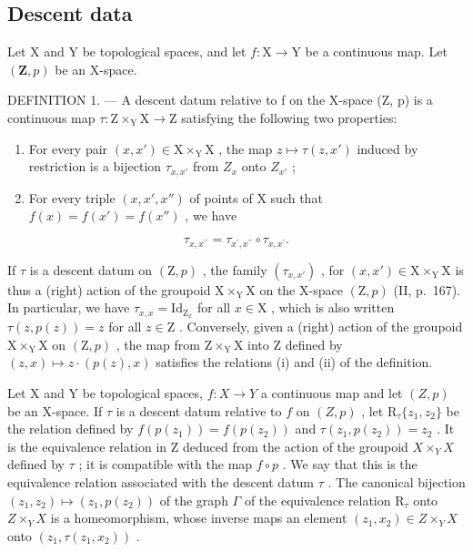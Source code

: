 \subsection{Descent data}

Let X and Y be topological spaces, and let \(f \colon \mathrm{X} \to \mathrm{Y}\) be a continuous map. Let \((\mathbf{Z}, p)\) be an X-space.

DEFINITION 1. --- A descent datum relative to f on the X-space (Z, p) is a continuous map \(\tau\colon \mathrm{Z}\times_{\mathrm{Y}}\mathrm{X}\to\mathrm{Z}\) satisfying the following two properties:

\begin{enumerate}
\def\labelenumi{(\roman{enumi})}
\item
  For every pair \((x, x') \in \mathrm{X} \times_{\mathrm{Y}} \mathrm{X}\) , the map \(z \mapsto \tau(z, x')\) induced by restriction is a bijection \(\tau_{x,x'}\) from \(Z_x\) onto \(Z_{x'}\) ;
\item
  For every triple \((x,x',x'')\) of points of X such that \(f(x)=f(x')=f(x'')\) , we have
\end{enumerate}

\[
\tau_ {x, x ^ {\prime \prime}} = \tau_ {x ^ {\prime}, x ^ {\prime \prime}} \circ \tau_ {x, x ^ {\prime}}.
\]

If \(\tau\) is a descent datum on \((\mathrm{Z},p)\) , the family \((\tau_{x,x'})\) , for \((x,x')\in \mathrm{X}\times_{\mathrm{Y}}\mathrm{X}\) is thus a (right) action of the groupoid \(\mathrm{X}\times_{\mathrm{Y}}\mathrm{X}\) on the X-space \((\mathrm{Z},p)\) (II, p.~167). In particular, we have \(\tau_{x,x} = \mathrm{Id}_{\mathrm{Z}_x}\) for all \(x\in \mathrm{X}\) , which is also written \(\tau (z,p(z)) = z\) for all \(z\in \mathrm{Z}\) . Conversely, given a (right) action of the groupoid \(\mathrm{X}\times_{\mathrm{Y}}\mathrm{X}\) on \((\mathrm{Z},p)\) , the map from \(\mathrm{Z}\times_{\mathrm{Y}}\mathrm{X}\) into Z defined by \((z,x)\mapsto z\cdot (p(z),x)\) satisfies the relations (i) and (ii) of the definition.

Let X and Y be topological spaces, \(f\colon X\to Y\) a continuous map and let \((Z,p)\) be an X-space. If \(\tau\) is a descent datum relative to \(f\) on \((Z,p)\) , let \(\mathrm{R}_{\tau}\{z_{1},z_{2}\}\) be the relation defined by \(f(p(z_{1})) = f(p(z_{2}))\) and \(\tau (z_1,p(z_2)) = z_2\) . It is the equivalence relation in Z deduced from the action of the groupoid \(X\times_Y X\) defined by \(\tau\) ; it is compatible with the map \(f\circ p\) . We say that this is the equivalence relation associated with the descent datum \(\tau\) . The canonical bijection \((z_{1},z_{2})\mapsto (z_{1},p(z_{2}))\) of the graph \(\Gamma\) of the equivalence relation \(\mathrm{R}_{\tau}\) onto \(Z\times_Y X\) is a homeomorphism, whose inverse maps an element \((z_{1},x_{2})\in Z\times_Y X\) onto \((z_{1},\tau (z_{1},x_{2}))\) .

